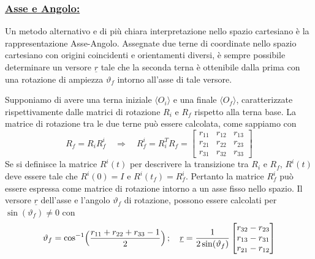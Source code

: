 \subsubsection{\underline{Asse e Angolo:}}
Un metodo alternativo e di più chiara interpretazione nello spazio cartesiano è la rappresentazione Asse-Angolo. Assegnate due terne di coordinate nello spazio cartesiano con origini coincidenti e orientamenti diversi, è sempre possibile determinare un versore $\underline{r}$ tale che la seconda terna è ottenibile dalla prima con una rotazione di ampiezza $\vartheta_f$ intorno all'asse di tale versore.

Supponiamo di avere una terna iniziale $\langle O_i \rangle$ e una finale $\langle O_f \rangle$, caratterizzate rispettivamente dalle matrici di rotazione $R_i$ e $R_f$ rispetto alla terna base. La matrice di rotazione tra le due terne può essere calcolata, come sappiamo con
\begin{equation}
	R_f = R_i R_f^i \quad \Rightarrow \quad R_f^i = R_i^T R_f = 
	\begin{bmatrix}
		r_{11} & r_{12} & r_{13} \\
		r_{21} & r_{22} & r_{23} \\
		r_{31} & r_{32} & r_{33} 
	\end{bmatrix}
\end{equation}
Se si definisce la matrice $R^i(t)$ per descrivere la transizione tra $R_i$ e $R_f$, $R^i(t)$ deve essere tale che $R^i(0) = I$ e $R^i(t_f)= R_f^i$. Pertanto la matrice $R_f^i$ può essere espressa come matrice di rotazione intorno a un asse fisso nello spazio. Il versore $\underline{r}$ dell'asse e l'angolo $\vartheta_f$ di rotazione, possono essere calcolati per $\sin(\vartheta_f) \neq 0$ con
\begin{equation*}
	\vartheta_f = \cos^{-1} \Bigl( \frac{r_{11} + r_{22} + r_{33} - 1}{2}  \Bigr)\,; \quad
	\underline{r} = \frac{1}{2 \sin(\vartheta_f)}
	\begin{bmatrix}
		r_{32} - r_{23} \\
		r_{13} - r_{31} \\
		r_{21} - r_{12} 
	\end{bmatrix}
\end{equation*}

